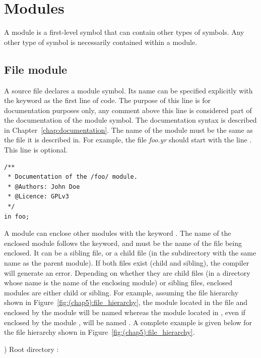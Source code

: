 \section{Modules}%
\label{sec:modules}

A module is a first-level symbol that can contain other types of symbols. Any
other type of symbol is necessarily contained within a module.

\subsection{File module}

A source file declares a module symbol. Its name can be specified explicitly
with the keyword  as the first line of code. The purpose of this line
is for documentation purposes only, any comment above this line is considered
part of the documentation of the module symbol. The documentation syntax is
described in Chapter~\ref{chap:documentation}. The name of the module must
be the same as the file it is described in. For example, the file
\textit{foo.yr} should start with the line . This line is
optional.


\begin{lstlisting}[style=coloredverbatim]
/**
 * Documentation of the /foo/ module.
 * @Authors: John Doe
 * @Licence: GPLv3
 */
in foo;
\end{lstlisting}

A module can enclose other modules with the keyword . The name of
the enclosed module follows the keyword, and must be the name of the file being
enclosed. It can be a sibling file, or a child file (in the subdirectory with
the same name as the parent module). If both files exist (child and sibling),
the compiler will generate an error. Depending on whether they are child files
(in a directory whose name is the name of the enclosing module) or sibling
files, enclosed modules are either child or sibling. For example, assuming the
file hierarchy shown in Figure~\ref{fig:(chap5):file_hierarchy}, the module located in
the file  and enclosed by the module  will
be named  whereas the module located in , even
if enclosed by the module , will be named . A complete
example is given below for the file hierarchy shown in
Figure~\ref{fig:(chap5):file_hierarchy}.



) Root directory :

